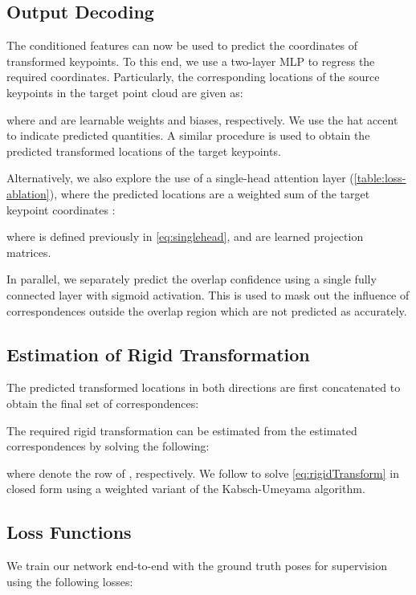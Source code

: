 \documentclass[10pt,twocolumn,letterpaper]{article}
\begin{document}
\subsection{Output Decoding}\label{sect:output-decode}
The conditioned features can now be used to predict the coordinates of transformed keypoints. To this end, we use a two-layer MLP to regress the required coordinates. Particularly, the corresponding locations  of the source keypoints  in the target point cloud are given as:

where  and  are learnable weights and biases, respectively. We use the hat accent  to indicate predicted quantities. A similar procedure is used to obtain the predicted transformed locations  of the target keypoints.

Alternatively, we also explore the use of a single-head attention layer (\cf \cref{table:loss-ablation}), where the predicted locations  are a weighted sum of the target keypoint coordinates :

where  is defined previously in \cref{eq:singlehead}, and
 are learned projection matrices.

In parallel, we separately predict the overlap confidence  using a single fully connected layer with sigmoid activation.
This is used to mask out the influence of correspondences outside the overlap region which are not predicted as accurately.






\subsection{Estimation of Rigid Transformation}\label{sect:rigid-est}
The predicted transformed locations in both directions are first concatenated to obtain the final set of  correspondences:

The required rigid transformation can be estimated from the estimated correspondences by solving the following:

where  denote the  row of , \mbox{respectively}.
We follow \cite{gojcic2020multiview,yew2020rpmnet} to solve \cref{eq:rigidTransform} in closed form using a weighted variant of the Kabsch-Umeyama \cite{kabsch1976svd,umeyama1991svd} algorithm.

\subsection{Loss Functions}
We train our network end-to-end with the ground truth poses  for supervision using the following losses:
\end{document}
